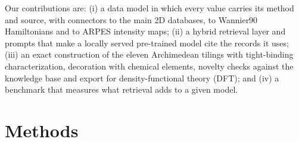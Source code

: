 \documentclass[prmaterials,twocolumn,superscriptaddress,longbibliography,nofootinbib]{revtex4-2}
\begin{document}
Our contributions are: (i) a data model in which every value carries its method and
source, with connectors to the main 2D databases, to Wannier90~\cite{Marzari2012,Pizzi2020}
Hamiltonians and to ARPES intensity maps; (ii) a hybrid retrieval layer and prompts that make
a locally served pre-trained model cite the records it uses; (iii) an exact construction of
the eleven Archimedean tilings with tight-binding characterization, decoration with chemical
elements, novelty checks against the knowledge base and export for density-functional theory
(DFT); and (iv) a benchmark that measures what retrieval adds to a given model.

\section{Methods}
\end{document}
